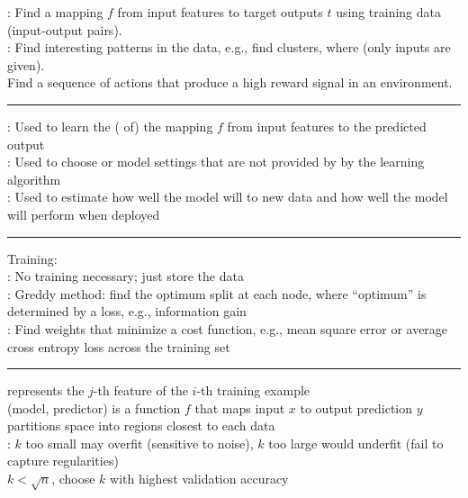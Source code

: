 \documentclass[10pt]{LatexTemplate/hw}
\begin{document}
\setlength{\abovedisplayskip}{0pt} %
\setlength{\belowdisplayskip}{0pt} %

\fontsize{9}{10}\selectfont

\begin{multicols*}{5}
: Find a mapping $f$ from input features  to target outputs $t$ using  training data (input-output pairs).\\
: Find interesting patterns in the data, e.g., find clusters, where  (only inputs are given).\\
 Find a sequence of actions that produce a high reward signal in an environment.\\
\rule{\linewidth}{0.4pt}
: Used to learn the ( of) the mapping $f$ from input features to the predicted output\\
: Used to choose  or model settings that are not provided by by the learning algorithm\\
: Used to estimate how well the model will  to new data and how well the model will perform when deployed\\
\rule{\linewidth}{0.4pt}
Training:\\
: No training necessary; just store the data \\
: Greddy method: find the optimum split at each node, where ``optimum'' is determined by a loss, e.g., information gain\\
: Find weights  that minimize a cost function, e.g., mean square error or average cross entropy loss across the training set\\
\rule{\linewidth}{0.4pt}
 represents the $j$-th feature of the $i$-th training example\\
 (model, predictor) is a function $f$ that maps input $x$ to output prediction $y$\\
 partitions space into regions closest to each data\\
: $k$ too small may overfit (sensitive to noise), $k$ too large would underfit (fail to capture regularities)\\
$k<\sqrt{n}$, choose $k$ with highest validation accuracy\\

\end{multicols*}
\end{document}
